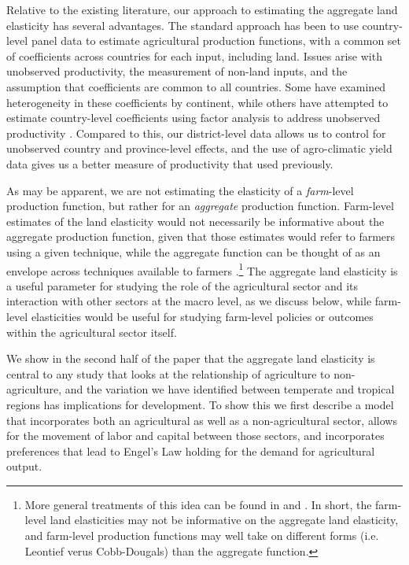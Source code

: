 \documentclass[11pt]{article}
\begin{document}
Relative to the existing literature, our approach to estimating the aggregate land elasticity has several advantages. The standard approach has been to use country-level panel data \citep{Hayami:1970ly,Hayami:1985cr,cpr1997,mm2001,Mundlak:2000dq,mbl2012,et2013mango} to estimate agricultural production functions, with a common set of coefficients across countries for each input, including land. Issues arise with unobserved productivity, the measurement of non-land inputs, and the assumption that coefficients are common to all countries. Some have examined heterogeneity in these coefficients \citep{gg2003,Wiebe2003Resource-Qualit} by continent, while others have attempted to estimate country-level coefficients using factor analysis to address unobserved productivity \citep{et2013mango,ev2016clim}. Compared to this, our district-level data allows us to control for unobserved country and province-level effects, and the use of agro-climatic yield data gives us a better measure of productivity that used previously. 

As may be apparent, we are not estimating the elasticity of a \textit{farm}-level production function, but rather for an \textit{aggregate} production function. Farm-level estimates of the land elasticity would not necessarily be informative about the aggregate production function, given that those estimates would refer to farmers using a given technique, while the aggregate function can be thought of as an envelope across techniques available to farmers \citep{Hayami:1970ly}.\footnote{More general treatments of this idea can be found in \citet{houthakker1955} and \citet{jones2005}. In short, the farm-level land elasticities may not be informative on the aggregate land elasticity, and farm-level production functions may well take on different forms (i.e. Leontief verus Cobb-Dougals) than the aggregate function.} The aggregate land elasticity is a useful parameter for studying the role of the agricultural sector and its interaction with other sectors at the macro level, as we discuss below, while farm-level elasticities would be useful for studying farm-level policies or outcomes within the agricultural sector itself.

We show in the second half of the paper that the aggregate land elasticity is central to any study that looks at the relationship of agriculture to non-agriculture, and the variation we have identified between temperate and tropical regions has implications for development. To show this we first describe a model that incorporates both an agricultural as well as a non-agricultural sector, allows for the movement of labor and capital between those sectors, and incorporates preferences that lead to Engel's Law holding for the demand for agricultural output. 
\end{document}
